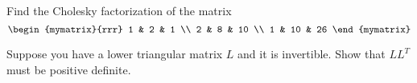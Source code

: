 \begin{enumialphparenastyle}
\begin{ex} Find the Cholesky factorization of the matrix 
\begin{equation*}
\begin{mymatrix}{rrr}
1 & 2 & 1 \\ 
2 & 8 & 10 \\ 
1 & 10 & 26
\end{mymatrix}
\end{equation*}
\end{ex}

\begin{ex} Suppose you have a lower triangular matrix $L$ and it is invertible.
Show that $LL^{T}$ must be positive definite.
\end{ex}

\end{enumialphparenastyle}